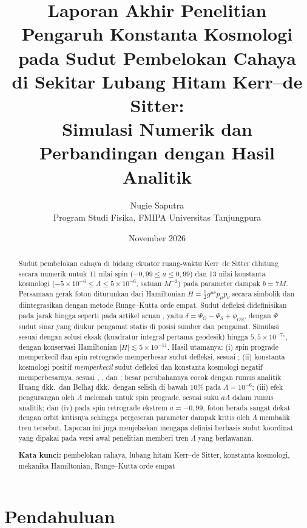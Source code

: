 \documentclass[11pt,a4paper]{article}
\title{\textbf{Laporan Akhir Penelitian}\\[6pt]
  \Large Pengaruh Konstanta Kosmologi pada Sudut Pembelokan Cahaya\\
  di Sekitar Lubang Hitam Kerr--de Sitter:\\
  Simulasi Numerik dan Perbandingan dengan Hasil Analitik}
\author{Nugie Saputra\\[2pt]
  \small Program Studi Fisika, FMIPA Universitas Tanjungpura}
\date{November 2026}
\begin{document}
\maketitle

\begin{abstract}
\noindent
Sudut pembelokan cahaya di bidang ekuator ruang-waktu Kerr--de Sitter dihitung secara numerik untuk
11 nilai spin ($-0{,}99 \le a \le 0{,}99$) dan 13 nilai konstanta kosmologi
($-5\times10^{-6} \le \Lambda \le 5\times10^{-6}$, satuan $M^{-2}$) pada parameter dampak $b = 7M$.
Persamaan gerak foton diturunkan dari Hamiltonian $H = \tfrac12 g^{\mu\nu}p_\mu p_\nu$ secara simbolik
dan diintegrasikan dengan metode Runge--Kutta orde empat. Sudut defleksi didefinisikan pada jarak hingga
seperti pada artikel acuan \citep{ishihara2016gravitational,belhaj2022light,huang2025influence}, yaitu
$\delta = \Psi_O - \Psi_S + \phi_{OS}$, dengan $\Psi$ sudut sinar yang diukur pengamat statis di posisi
sumber dan pengamat. Simulasi sesuai dengan solusi eksak (kuadratur integral pertama geodesik) hingga
$5{,}5\times10^{-7}{}^\circ$, dengan konservasi Hamiltonian $|H| \lesssim 5\times10^{-11}$. Hasil utamanya:
(i) spin prograde memperkecil dan spin retrograde memperbesar sudut defleksi, sesuai
\citet{congdon2022asymmetric}; (ii) konstanta kosmologi positif \emph{memperkecil} sudut defleksi dan
konstanta kosmologi negatif memperbesarnya, sesuai \citet{rindler2007contribution},
\citet{belhaj2022light}, dan \citet{huang2025influence}; besar perubahannya cocok dengan rumus analitik
Huang dkk.\ dan Belhaj dkk.\ dengan selisih di bawah $10\%$ pada $\Lambda = 10^{-6}$; (iii) efek pengurangan oleh
$\Lambda$ melemah untuk spin prograde, sesuai suku $a\Lambda$ dalam rumus analitik; dan (iv) pada spin
retrograde ekstrem $a = -0{,}99$, foton berada sangat dekat dengan orbit kritisnya sehingga pergeseran
parameter dampak kritis oleh $\Lambda$ membalik tren tersebut. Laporan ini juga menjelaskan mengapa
definisi berbasis sudut koordinat yang dipakai pada versi awal penelitian memberi tren $\Lambda$ yang
berlawanan.

\medskip\noindent
\textbf{Kata kunci:} pembelokan cahaya, lubang hitam Kerr--de Sitter, konstanta kosmologi, mekanika
Hamiltonian, Runge--Kutta orde empat
\end{abstract}

\tableofcontents
\newpage

\section{Pendahuluan}
\end{document}
